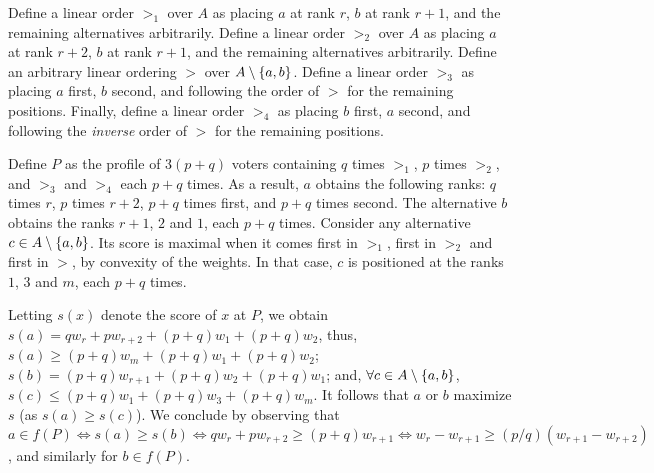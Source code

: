 \documentclass{article}
\begin{document}
\begin{proof*}
	Define a linear order $>_1$ over $A$ as placing $a$ at rank $r$, $b$ at rank $r + 1$, and the remaining alternatives arbitrarily. 
	Define a linear order $>_2$ over $A$ as placing $a$ at rank $r + 2$, $b$ at rank $r + 1$, and the remaining alternatives arbitrarily.
	Define an arbitrary linear ordering $>$ over $A \setminus \{a, b\}$. 
	Define a linear order $>_3$ as placing $a$ first, $b$ second, and following the order of $>$ for the remaining positions.
	Finally, define a linear order $>_4$ as placing $b$ first, $a$ second, and following the \emph{inverse} order of $>$ for the remaining positions.
	
	Define $P$ as the profile of $3 (p + q)$ voters containing $q$ times $>_1$, $p$ times $>_2$, and $>_3$ and $>_4$ each $p + q$ times.
	As a result, $a$ obtains the following ranks: $q$ times $r$, $p$ times $r + 2$, $p + q$ times first, and $p + q$ times second. The alternative $b$ obtains the ranks $r + 1$, $2$ and $1$, each $p + q$ times. Consider any alternative $c \in A \setminus \{a, b\}$. Its score is maximal when it comes first in $>_1$, first in $>_2$ and first in $>$, by convexity of the weights. In that case, $c$ is positioned at the ranks $1$, $3$ and $m$, each $p + q$ times. 
	
	Letting $s(x)$ denote the score of $x$ at $P$, we obtain $s(a) = q w_r + p w_{r + 2} + (p + q) w_1 + (p + q) w_2$, thus, $s(a) ≥ (p + q) w_m + (p + q) w_1 + (p + q) w_2$; $s(b) = (p + q) w_{r + 1} + (p + q) w_2 + (p + q) w_1$; and, $\forall c \in A \setminus \{a, b\}$, 
	$s(c) ≤ (p + q) w_1 + (p + q) w_3 + (p + q) w_m$. It follows that $a$ or $b$ maximize $s$ (as $s(a) ≥ s(c)$). We conclude by observing that $a \in f(P) ⇔ s(a) ≥ s(b) ⇔ q w_r + p w_{r + 2} ≥ (p + q) w_{r + 1} ⇔ w_r - w_{r + 1} ≥ (p / q) (w_{r + 1} - w_{r + 2})$, and similarly for $b \in f(P)$.
\end{proof*}
\end{document}
